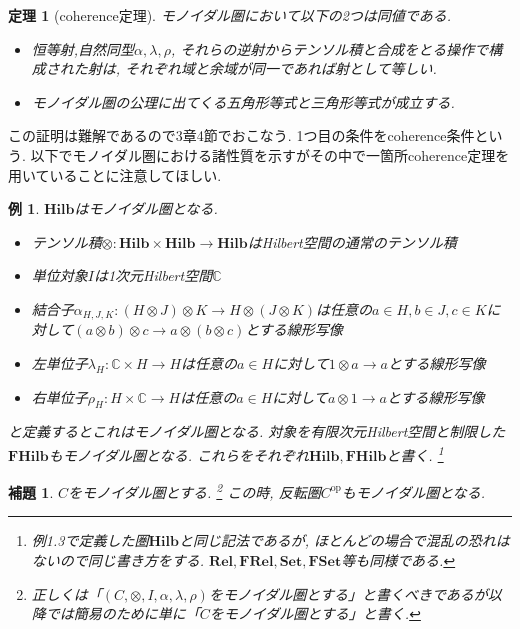 \documentclass[a4paper,12pt]{ltjsarticle}
\theoremstyle{break}
\newtheorem{eg}[thm]{例}
\newtheorem{thrm}[thm]{定理}
\newtheorem{lem}[thm]{補題}
\newcommand{\cset}{\mathbf{Set}}
\newcommand{\fset}{\mathbf{FSet}}
\newcommand{\rel}{\mathbf{Rel}}
\newcommand{\frel}{\mathbf{FRel}}
\newcommand{\hilb}{\mathbf{Hilb}}
\newcommand{\fhilb}{\mathbf{FHilb}}
\newcommand{\mbc}{\mathbb{C}}
\newcommand{\Op}{\mathrm{op}}
\newcommand{\al}{\alpha}
\newcommand{\la}{\lambda}
\newcommand{\ot}{\otimes}
\newcommand{\ti}{\times}
\numberwithin{equation}{section}
\begin{document}
\begin{thrm}[coherence定理]
  モノイダル圏において以下の2つは同値である. 
  \begin{itemize}
    \item 恒等射,自然同型$\al,\la,\rho$, それらの逆射からテンソル積と合成をとる操作で構成された射は, それぞれ域と余域が同一であれば射として等しい. 
    \item モノイダル圏の公理に出てくる五角形等式と三角形等式が成立する. 
  \end{itemize}
\end{thrm}

この証明は難解であるので3章4節でおこなう. 
1つ目の条件をcoherence条件という. 
以下でモノイダル圏における諸性質を示すがその中で一箇所coherence定理を用いていることに注意してほしい. 

\begin{eg}
  $\hilb$はモノイダル圏となる. 
  \begin{itemize}
    \item テンソル積$\ot : \hilb \ti \hilb \to \hilb$はHilbert空間の通常のテンソル積
    \item 単位対象$I$は1次元Hilbert空間$\mbc$
    \item 結合子$\al_{H,J,K}: (H \ot J) \ot K \to H \ot (J \ot K)$は任意の$a \in H, b \in J, c \in K$に対して$(a \ot b) \ot c \to a \ot (b \ot c)$とする線形写像
    \item 左単位子$\la_H: \mbc \ti H \to H$は任意の$a \in H$に対して$1 \ot a \to a$とする線形写像
    \item 右単位子$\rho_H: H \ti \mbc  \to H$は任意の$a \in H$に対して$a \ot 1 \to a$とする線形写像
  \end{itemize}
  と定義するとこれはモノイダル圏となる. 
  対象を有限次元Hilbert空間と制限した$\fhilb$もモノイダル圏となる. 
  これらをそれぞれ$\hilb, \fhilb$と書く. 
  \footnote{
      例1.3で定義した圏$\hilb$と同じ記法であるが, ほとんどの場合で混乱の恐れはないので同じ書き方をする. 
      $\rel, \frel, \cset, \fset$等も同様である. 
    } 
\end{eg} 


\begin{lem}
  $C$をモノイダル圏とする.
  \footnote{
    正しくは「$(C,\ot,I,\al,\la,\rho)$をモノイダル圏とする」と書くべきであるが以降では簡易のために単に「$C$をモノイダル圏とする」と書く. 
  } 
  この時, 反転圏$C^{\Op}$もモノイダル圏となる. 
\end{lem}
\end{document}
